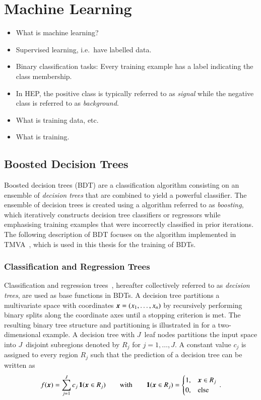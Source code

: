 \section{Machine Learning}

\begin{itemize}
\item What is machine learning?
\item Supervised learning, i.e.\ have labelled data.
\item Binary classification tasks: Every training example has a label indicating
  the class membership.
\item In HEP, the positive class is typically referred to as \emph{signal} while
  the negative class is referred to as \emph{background}.
\item What is training data, etc.
\item What is training.
\end{itemize}


\subsection{Boosted Decision Trees}

Boosted decision trees (BDT) are a classification algorithm consisting on an
ensemble of \emph{decision trees} that are combined to yield a powerful
classifier. The ensemble of decision trees is created using a algorithm referred
to as \emph{boosting}, which iteratively constructs decision tree classifiers or
regressors while emphasising training examples that were incorrectly classified
in prior iterations. The following description of BDT focuses on the algorithm
implemented in \textsc{TMVA}~\cite{TMVA}, which is used in this thesis for the
training of BDTs.

\subsubsection{Classification and Regression Trees}

Classification and regression trees~\cite{Breiman:1984jka,hastie09}, hereafter
collectively referred to as \emph{decision trees}, are used as base functions in
BDTs. A decision tree partitions a multivariate space with coordinates
$\myvec{x} = (x_1, \dots, x_n)$ by recursively performing binary splits along
the coordinate axes until a stopping criterion is met. The resulting binary tree
structure and partitioning is illustrated in  for a
two-dimensional example. A decision tree with $J$~leaf nodes partitions the
input space into $J$~disjoint subregions denoted by $R_j$ for $j = 1, \dots,
J$. A constant value $c_j$ is assigned to every region $R_j$ such that the
prediction of a decision tree can be written as~\cite{hastie09}
\begin{align*}
  f(\myvec{x}) = \sum_{j = 1}^{J} c_j \, \mathbf{1}(\myvec{x} \in R_j) \qquad \text{with} \qquad \mathbf{1}(\myvec{x} \in R_j) =
  \begin{cases}
    1, & \myvec{x} \in R_j \\
    0, & \text{else}
  \end{cases} \,\text{.}
\end{align*}

